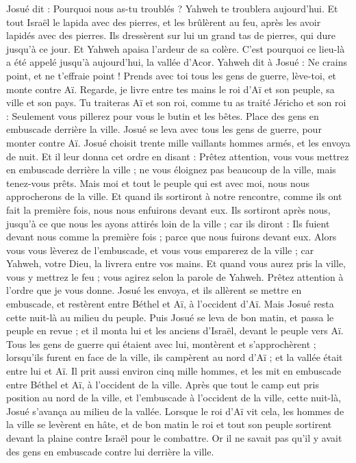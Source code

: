 \begin{multicols}{2}
Josué dit : Pourquoi nous as-tu troublés ? Yahweh te troublera aujourd’hui. Et tout Israël le lapida avec des pierres, et les brûlèrent au feu, après les avoir lapidés avec des pierres.
Ils dressèrent sur lui un grand tas de pierres, qui dure jusqu’à ce jour. Et Yahweh apaisa l’ardeur de sa colère. C’est pourquoi ce lieu-là a été appelé jusqu’à aujourd’hui, la vallée d’Acor.
\VerseOne{}Yahweh dit à Josué : Ne crains point, et ne t’effraie point ! Prends avec toi tous les gens de guerre, lève-toi, et monte contre Aï. Regarde, je livre entre tes mains le roi d’Aï et son peuple, sa ville et son pays.
Tu traiteras Aï et son roi, comme tu as traité Jéricho et son roi : Seulement vous pillerez pour vous le butin et les bêtes. Place des gens en embuscade derrière la ville.
Josué se leva avec tous les gens de guerre, pour monter contre Aï. Josué choisit trente mille vaillants hommes armés, et les envoya de nuit.
Et il leur donna cet ordre en disant : Prêtez attention, vous vous mettrez en embuscade derrière la ville ; ne vous éloignez pas beaucoup de la ville, mais tenez-vous prêts.
Mais moi et tout le peuple qui est avec moi, nous nous approcherons de la ville. Et quand ils sortiront à notre rencontre, comme ils ont fait la première fois, nous nous enfuirons devant eux.
Ils sortiront après nous, jusqu’à ce que nous les ayons attirés loin de la ville ; car ils diront : Ils fuient devant nous comme la première fois ; parce que nous fuirons devant eux.
Alors vous vous lèverez de l’embuscade, et vous vous emparerez de la ville ; car Yahweh, votre Dieu, la livrera entre vos mains.
Et quand vous aurez pris la ville, vous y mettrez le feu ; vous agirez selon la parole de Yahweh. Prêtez attention à l’ordre que je vous donne.
Josué les envoya, et ils allèrent se mettre en embuscade, et restèrent entre Béthel et Aï, à l’occident d’Aï. Mais Josué resta cette nuit-là au milieu du peuple.
Puis Josué se leva de bon matin, et passa le peuple en revue ; et il monta lui et les anciens d’Israël, devant le peuple vers Aï.
Tous les gens de guerre qui étaient avec lui, montèrent et s’approchèrent ; lorsqu’ils furent en face de la ville, ils campèrent au nord d’Aï ; et la vallée était entre lui et Aï.
Il prit aussi environ cinq mille hommes, et les mit en embuscade entre Béthel et Aï, à l’occident de la ville.
Après que tout le camp eut pris position au nord de la ville, et l’embuscade à l’occident de la ville, cette nuit-là, Josué s’avança au milieu de la vallée.
Lorsque le roi d’Aï vit cela, les hommes de la ville se levèrent en hâte, et de bon matin le roi et tout son peuple sortirent devant la plaine contre Israël pour le combattre. Or il ne savait pas qu’il y avait des gens en embuscade contre lui derrière la ville.

\end{multicols}
